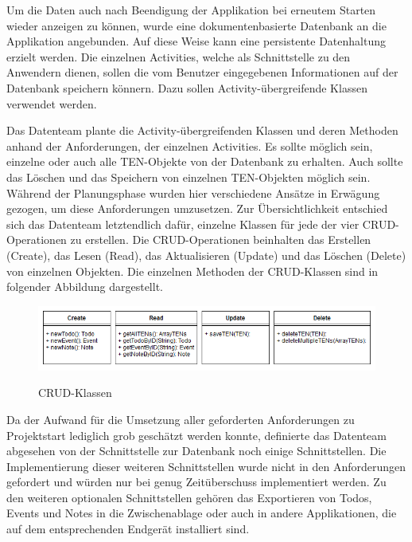 Um die Daten auch nach Beendigung der Applikation bei erneutem Starten wieder anzeigen zu können, wurde eine dokumentenbasierte Datenbank an die Applikation angebunden. Auf diese Weise kann eine persistente Datenhaltung erzielt werden. Die einzelnen Activities, welche als Schnittstelle zu den Anwendern dienen, sollen die vom Benutzer eingegebenen Informationen auf der Datenbank speichern könnern. Dazu sollen Activity-übergreifende Klassen verwendet werden.

Das Datenteam plante die Activity-übergreifenden Klassen und deren Methoden anhand der Anforderungen, der einzelnen Activities. Es sollte möglich sein, einzelne oder auch alle TEN-Objekte von der Datenbank zu erhalten. Auch sollte das Löschen und das Speichern von einzelnen TEN-Objekten möglich sein. Während der Planungsphase wurden hier verschiedene Ansätze in Erwägung gezogen, um diese Anforderungen umzusetzen. Zur Übersichtlichkeit entschied sich das Datenteam letztendlich dafür, einzelne Klassen für jede der vier CRUD-Operationen zu erstellen. Die CRUD-Operationen beinhalten das Erstellen (Create), das Lesen (Read), das Aktualisieren (Update) und das Löschen (Delete) von einzelnen Objekten. Die einzelnen Methoden der CRUD-Klassen sind in folgender Abbildung dargestellt.

\begin{figure}[H]
\centering
\begin{minipage}[t]{1\textwidth} %
\caption{CRUD-Klassen} %
\includegraphics[width=1\textwidth]{img/CRUD-Klassen}\\ %
\end{minipage}
\end{figure}

Da der Aufwand für die Umsetzung aller geforderten Anforderungen zu Projektstart lediglich grob geschätzt werden konnte, definierte das Datenteam abgesehen von der Schnittstelle zur Datenbank noch einige Schnittstellen. Die Implementierung dieser weiteren Schnittstellen wurde nicht in den Anforderungen gefordert und würden nur bei genug Zeitüberschuss implementiert werden. Zu den weiteren optionalen Schnittstellen gehören das Exportieren von Todos, Events und Notes in die Zwischenablage oder auch in andere Applikationen, die auf dem entsprechenden Endgerät installiert sind.

